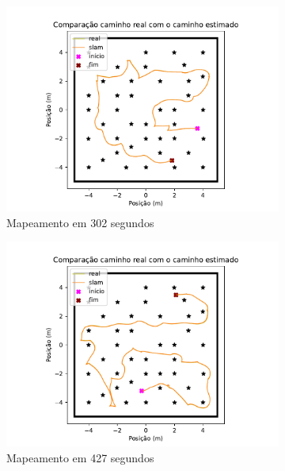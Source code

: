 \begin{figure}
  \begin{subfigure}{0.49\textwidth}
    \includegraphics[width=\textwidth]{figs/single-agent/rb1-path-best-time.pdf} 
    \caption{Mapeamento em 302 segundos}
    \label{fig:single-agent-path-best}
  \end{subfigure}
  \begin{subfigure}{0.49\textwidth}
    \includegraphics[width=\textwidth]{figs/single-agent/rb1-path-medium-low.pdf} 
    \caption{Mapeamento em 427 segundos}
    \label{fig:single-agente-path-medium-low}
  \end{subfigure}
  \begin{subfigure}{0.49\textwidth}

\end{subfigure}
\end{figure}
